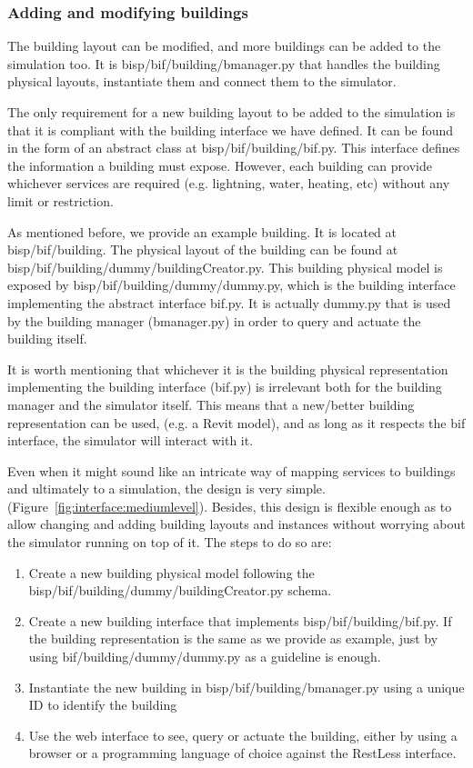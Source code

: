 \documentclass[10pt]{article}
\begin{document}
\subsubsection{Adding and modifying buildings}

The building layout can be modified, and more buildings can be added to the simulation too. It is bisp/bif/building/bmanager.py that handles the building physical layouts, instantiate them and connect them to the simulator.

The only requirement for a new building layout to be added to the simulation is that it is compliant with the building interface we have defined. It can be found in the form of an abstract class at bisp/bif/building/bif.py. This interface defines the information a building must expose. However, each building can provide whichever services are required (e.g.  lightning, water, heating, etc) without any limit or restriction. 

As mentioned before, we provide an example building. It is located at bisp/bif/building. The physical layout of the building can be found at bisp/bif/building/dummy/buildingCreator.py. This building physical model is exposed by bisp/bif/building/dummy/dummy.py, which is the building interface implementing the abstract interface bif.py. It is actually dummy.py that is used by the building manager (bmanager.py) in order to query and actuate the building itself.

It is worth mentioning that whichever it is the building physical representation implementing the building interface (bif.py) is irrelevant both for the building manager and the simulator itself. This means that a new/better building representation can be used, (e.g. a Revit model), and as long as it respects the bif interface, the simulator will interact with it.

Even when it might sound like an intricate way of mapping services to buildings and ultimately to a simulation, the design is very simple. (Figure~\ref{fig:interface:mediumlevel}). Besides, this design is flexible enough as to allow changing and adding building layouts and instances without worrying about the simulator running on top of it. The steps to do so are:

\begin{enumerate}
\item{Create a new building physical model following the bisp/bif/building/dummy/buildingCreator.py schema.}
\item{Create a new building interface that implements bisp/bif/building/bif.py. If the building representation is the same as we provide as example, just by using bif/building/dummy/dummy.py as a guideline is enough.}
\item{Instantiate the new building in bisp/bif/building/bmanager.py using a unique ID to identify the building}
\item{Use the web interface to see, query or actuate the building, either by using a browser or a programming language of choice against the RestLess interface.}
\end{enumerate}
\end{document}
